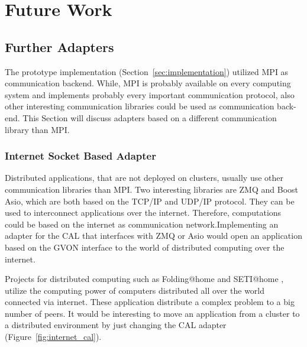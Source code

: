 \chapter{Future Work}
\label{sec:futurework}



\section*{Further Adapters}

The prototype implementation (Section~\ref{sec:implementation})
utilized MPI as communication backend. While, MPI is probably
available on every computing system and implements probably every
important communication protocol, also other interesting communication
libraries could be used as communication back-end.  This Section will
discuss adapters based on a different communication library than MPI.

\subsection*{Internet Socket Based Adapter}

Distributed applications, that are not deployed on clusters,
usually use other communication libraries than MPI. Two
interesting libraries are ZMQ and Boost Asio, which are both based
on the TCP/IP and UDP/IP protocol. They can be used to
interconnect applications over the internet. Therefore,
computations could be based on the internet as communication
network.Implementing an adapter for the CAL that interfaces with
ZMQ or Asio would open an application based on the GVON interface
to the world of distributed computing over the internet.

Projects for distributed computing such as Folding@home
\cite{ref:folding_at_home} and SETI@home \cite{ref:seti_at_home},
utilize the computing power of computers distributed all over the
world connected via internet.  These application distribute a
complex problem to a big number of peers. It would be interesting
to move an application from a cluster to a distributed environment
by just changing the CAL adapter (Figure~\ref{fig:internet_cal}).

